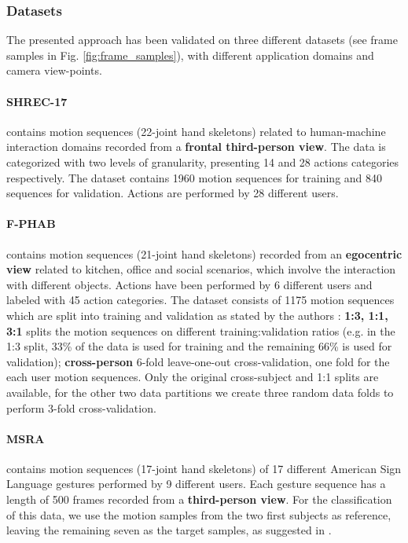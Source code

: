 \documentclass[letterpaper, 10 pt, conference]{ieeeconf}
\begin{document}
\subsubsection{Datasets}\label{sec:datasets} The presented approach has been validated on three different datasets (see frame samples in Fig. \ref{fig:frame_samples}), with different application domains and camera view-points.


\paragraph*{SHREC-17 \cite{de2017shrec}} contains motion sequences (22-joint hand skeletons) related to human-machine interaction domains recorded from a \textbf{frontal third-person view}. The data is categorized with two levels of granularity, presenting 14 and 28 actions categories respectively. The dataset contains 1960 motion sequences for training and 840 sequences for validation. 
Actions are performed by 28 different users.

\paragraph*{F-PHAB \cite{garcia2018first}} contains motion sequences (21-joint hand skeletons) recorded from an \textbf{egocentric view} related to kitchen, office and social scenarios, which involve the interaction with different objects. 
Actions have been performed by 6 different users and labeled with 45 action categories.
The dataset consists of 1175 motion 
sequences which are split into training and validation as stated by the authors \cite{garcia2018first}:
    \textbf{1:3, 1:1, 3:1} splits the motion sequences on different training:validation ratios (e.g. in the 1:3 split, 33\% of the data is used for training and the remaining 66\% is used for validation);
    \textbf{cross-person} 6-fold leave-one-out cross-validation, one fold for the each user motion sequences.
Only the original cross-subject and 1:1 splits are available, for the other two data partitions we create three random data folds to perform 3-fold cross-validation.

\paragraph*{MSRA \cite{sun2015cascaded}} contains motion sequences (17-joint hand skeletons) of 17 different American Sign Language gestures performed by 9 different users. Each gesture sequence has a length of 500 frames recorded from a \textbf{third-person view}.
For the classification of this data, we use the motion samples from the two first subjects as reference, leaving the remaining seven as the target samples, as suggested in \cite{liu20203d}. \\
\end{document}
